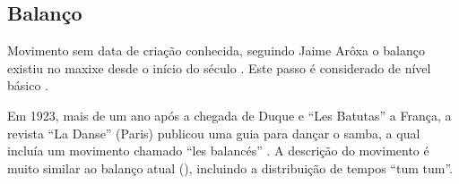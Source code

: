 \subsection{Balanço}

Movimento sem data de criação conhecida, 
seguindo Jaime Arôxa o balanço existiu no maxixe desde o início do século \cite{EntrevistaJaimeAroxa1}.
Este passo é considerado de nível básico \cite[pp. 144]{perna2002samba}.

Em 1923, mais de um ano após a chegada de Duque e ``Les Batutas'' a França, 
a revista ``La Danse'' (Paris) publicou uma guia para dançar o samba, %
a qual incluía um movimento chamado ``les balancés'' \cite[pp. 10-11]{LaDanse:38}.
A descrição do movimento é muito similar ao balanço atual (\AnoLivro), %
incluindo a distribuição de tempos ``tum tum''.


